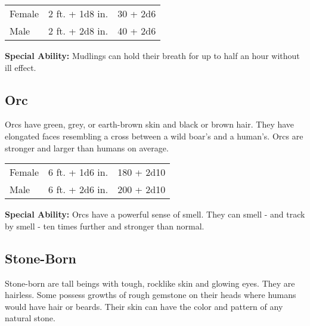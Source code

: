 \begin{multicols}{2}
\begin{center}
{
\begin{xtabular}{|l|l|l|}
Female & 2 ft. + 1d8 in. & 30 + 2d6 \\
Male & 2 ft. + 2d8 in. & 40 + 2d6 \\
\hline
\end{xtabular}
}
\end{center}

\textbf{Special Ability:} Mudlings can hold their breath for up to half an hour without ill effect.

\subsection{Orc} 

Orcs have green, grey, or earth-brown skin and black or brown hair. They have
elongated faces resembling a cross between a wild boar's and a human's. Orcs
are stronger and larger than humans on average.

\begin{center}
{
\begin{xtabular}{|l|l|l|}
Female & 6 ft. + 1d6 in. & 180 + 2d10 \\
Male & 6 ft. + 2d6 in. & 200 + 2d10 \\
\hline
\end{xtabular}
}
\end{center}

\textbf{Special Ability:} Orcs have a powerful sense of smell. They can smell - and track by smell - ten times further and stronger than normal.

\subsection{Stone-Born}

Stone-born are tall beings with tough, rocklike skin and glowing eyes. They are hairless. Some
possess growths of rough gemstone on their heads where humans would have hair or beards. Their
skin can have the color and pattern of any natural stone.


\end{multicols}
